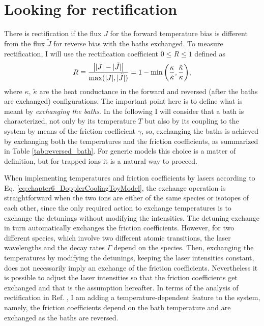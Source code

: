 \section{Looking for rectification\label{sec:lookingForR}}
%
%
There is rectification if the flux $J$  for the forward temperature bias is different from the flux $\tilde{J}$ for reverse bias
with the baths exchanged.  To measure rectification, I will use the rectification coefficient $0\le R\le 1$ defined as
%
\begin{equation}
  R \equiv \frac{\abs{|J|-|\tilde{J}|}}{\max(|J|,|\tilde{J}|)}
  = 1 - \min{ \left( \frac{\kappa}{\tilde{\kappa}} , \frac{\tilde{\kappa}}{\kappa} \right) },
  \label{eq:chapter6_Rectification}
\end{equation}
%
where $\kappa$, $\tilde{\kappa}$ are the heat conductance in the forward and reversed (after the baths are exchanged) configurations. The important point here is to define what is meant by \textit{exchanging the baths}. In the following I will consider that a bath is characterized, not only by its temperature $T$ but also by its coupling  to the system by means of the friction coefficient $\gamma$, so, exchanging the baths is achieved by exchanging both the temperatures and the friction coefficients, as summarized in Table \ref{tab:reversed_bath}. For generic models this
choice is a matter of definition, but for trapped ions it is a natural way to proceed.

When implementing temperatures and friction coefficients by lasers according to
Eq. \eqref{eq:chapter6_DopplerCoolingToyModel}, the exchange operation is straightforward when the two ions are either of the same species or isotopes of each other, since the only required action to exchange temperatures is to exchange the detunings without modifying the intensities. The detuning exchange in turn automatically exchanges the friction coefficients. However, for two different species, which involve two different atomic transitions, the laser wavelengths and the decay rates $\Gamma$ depend on the species. Then, exchanging the temperatures by modifying the detunings, keeping the laser intensities constant, does not necessarily imply an exchange of the friction coefficients. Nevertheless it is possible to adjust the laser intensities so that the friction coefficients get exchanged and that is the assumption hereafter. In terms of the analysis of rectification in Ref. \cite{Pereira2017}, I am adding a temperature-dependent feature to the system, namely,  the friction coefficients depend on the bath temperature and are exchanged as the baths are reversed.


